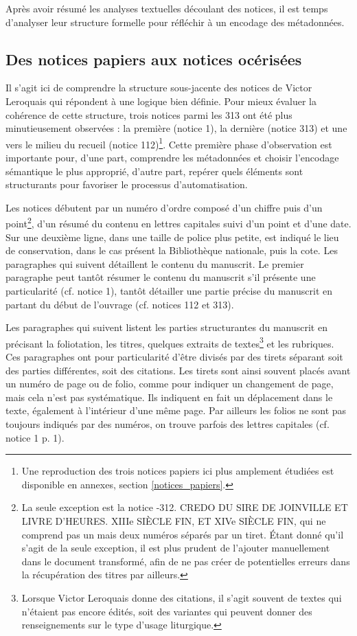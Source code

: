 \documentclass[a4paper,12pt,twoside]{book}
\begin{document}
	Après avoir résumé les analyses textuelles découlant des notices, il est temps d'analyser leur structure formelle pour réfléchir à un encodage des métadonnées.
	
	\subsection{Des notices papiers aux notices océrisées }
	
	Il s'agit ici de comprendre la structure sous-jacente des notices de Victor Leroquais qui répondent à une logique bien définie. Pour mieux évaluer la cohérence de cette structure, trois notices parmi les 313 ont été plus minutieusement observées : la première (notice 1), la dernière (notice 313) et une vers le milieu du recueil (notice 112)\footnote{Une reproduction des trois notices papiers ici plus amplement étudiées est disponible en annexes, section \ref{notices_papiers}.}. Cette première phase d'observation est importante pour, d'une part, comprendre les métadonnées et choisir l'encodage sémantique le plus approprié, d'autre part, repérer quels éléments sont structurants pour favoriser le processus d'automatisation.
	
	Les notices débutent par un numéro d'ordre composé d'un chiffre puis d'un point\footnote{La seule exception est la notice -312. CREDO DU SIRE DE JOINVILLE ET LIVRE D’HEURES. XIIIe SIÈCLE FIN, ET XIVe SIÈCLE FIN\fg{}, qui ne comprend pas un mais deux numéros séparés par un tiret. Étant donné qu'il s’agit de la seule exception, il est plus prudent de l'ajouter manuellement dans le document transformé, afin de ne pas créer de potentielles erreurs dans la récupération des titres par ailleurs.}, d'un résumé du contenu en lettres capitales suivi d'un point et d'une date. Sur une deuxième ligne, dans une taille de police plus petite, est indiqué le lieu de conservation, dans le cas présent la Bibliothèque nationale, puis la cote. Les paragraphes qui suivent détaillent le contenu du manuscrit. Le premier paragraphe peut tantôt résumer le contenu du manuscrit s'il présente une particularité (cf. notice 1), tantôt détailler une partie précise du manuscrit en partant du début de l'ouvrage (cf. notices 112 et 313). 
	
	Les paragraphes qui suivent listent les parties structurantes du manuscrit en précisant la foliotation, les titres, quelques extraits de textes\footnote{Lorsque Victor Leroquais donne des citations, il s'agit souvent de textes qui n'étaient pas encore édités, soit des variantes qui peuvent donner des renseignements sur le type d'usage liturgique.} et les rubriques. Ces paragraphes ont pour particularité
	d'être divisés par des tirets séparant soit des parties différentes, soit des citations. Les tirets sont ainsi souvent placés avant un numéro de page ou de folio, comme pour indiquer un changement de page, mais cela n'est pas systématique. Ils indiquent en fait un déplacement dans le texte, également à l'intérieur d'une même page. Par ailleurs les folios ne sont pas toujours indiqués par des numéros, on trouve parfois des lettres capitales (cf. notice 1 p. 1). 
	
\end{document}
